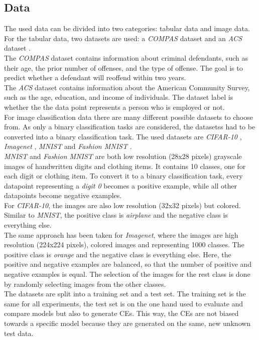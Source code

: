\documentclass{article}
\begin{document}
\subsection{Data}
The used data can be divided into two categories: tabular data and image data. For the tabular data, two datasets are used: a \textit{COMPAS} dataset \cite{compas_dataset} and an \textit{ACS} dataset \cite{acs_dataset}. \\
The \textit{COMPAS} dataset contains information about criminal defendants, such as their age, the prior number of offenses, and the type of offense. The goal is to predict whether a defendant will reoffend within two years. \\
The \textit{ACS} dataset contains information about the American Community Survey, such as the age, education, and income of individuals. The dataset label is whether the the data point represents a person who is employed or not. \\
For image classification data there are many different possible datasets to choose from. As only a binary classification tasks are considered, the datasetss had to be converted into a binary classification task. The used datasets are \textit{CIFAR-10} \cite{cifar10_dataset}, \textit{Imagenet} \cite{imagenet_dataset}, \textit{MNIST} \cite{mnist_dataset} and \textit{Fashion MNIST} \cite{fashion_mnist}.\\
\textit{MNIST} and \textit{Fashion MNIST} are both low resolution (28x28 pixels) grayscale images of handwritten digits and clothing items. It contains 10 classes, one for each digit or clothing item. To convert it to a binary classification task, every datapoint representing a \textit{digit 0} becomes a positive example, while all other datapoints become negative examples. \\
For \textit{CIFAR-10}, the images are also low resolution (32x32 pixels) but colored. Similar to \textit{MNIST}, the positive class is \textit{airplane} and the negative class is everything else. \\
The same approach has been taken for \textit{Imagenet}, where the images are high resolution (224x224 pixels), colored images and representing 1000 classes. The positive class is \textit{orange} and the negative class is everything else. Here, the positive and negative examples are balanced, so that the number of positive and negative examples is equal. The selection of the images for the rest class is done by randomly selecting images from the other classes. \\
The datasets are split into a training set and a test set. The training set is the same for all experiments, the test set is on the one hand used to evaluate and compare models but also to generate CEs. This way, the CEs are not biased towards a specific model because they are generated on the same, new unknown test data. 
\end{document}

